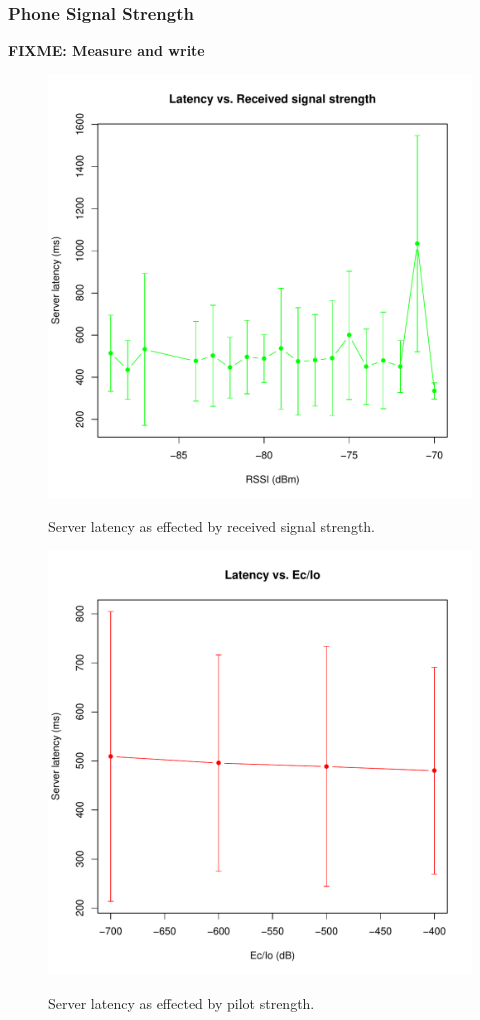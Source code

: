 \documentclass{acm_proc_article-sp}
\newcommand{\FIXME}[1]{{\color{red}\textbf{FIXME: #1}}}
\begin{document}
\subsubsection{Phone Signal Strength}
\FIXME{Measure and write}

\begin{figure}
\centering
\includegraphics[scale=0.5]{figs/latencyVsRSSI}
\label{fig:latencyVsRSSI}
\caption{Server latency as effected by received signal strength.}
\end{figure}

\begin{figure}
\centering
\includegraphics[scale=0.5]{figs/latencyVsEcIo}
\label{fig:latencyVsEcIo}
\caption{Server latency as effected by pilot strength.}
\end{figure}
\end{document}
